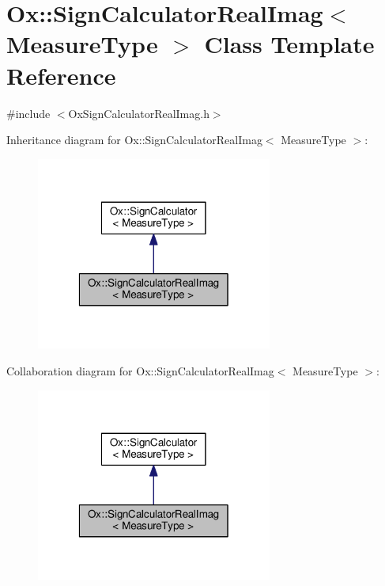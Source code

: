 \hypertarget{class_ox_1_1_sign_calculator_real_imag}{\section{Ox\-:\-:Sign\-Calculator\-Real\-Imag$<$ Measure\-Type $>$ Class Template Reference}
\label{class_ox_1_1_sign_calculator_real_imag}
}


{\ttfamily \#include $<$Ox\-Sign\-Calculator\-Real\-Imag.\-h$>$}



Inheritance diagram for Ox\-:\-:Sign\-Calculator\-Real\-Imag$<$ Measure\-Type $>$\-:
\nopagebreak
\begin{figure}[H]
\begin{center}
\leavevmode
\includegraphics[width=220pt]{class_ox_1_1_sign_calculator_real_imag__inherit__graph}
\end{center}
\end{figure}


Collaboration diagram for Ox\-:\-:Sign\-Calculator\-Real\-Imag$<$ Measure\-Type $>$\-:
\nopagebreak
\begin{figure}[H]
\begin{center}
\leavevmode
\includegraphics[width=220pt]{class_ox_1_1_sign_calculator_real_imag__coll__graph}
\end{center}
\end{figure}
